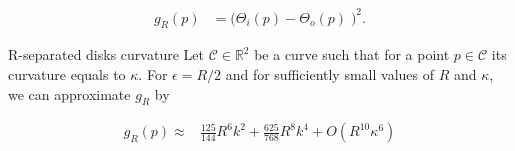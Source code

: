 \begin{align*}
	g_{R}(p) &= \Big( \Theta_i(p) - \Theta_o(p) \;\Big)^2.
\end{align*}

\begin{claim}{R-separated disks curvature}\label{claim:r-separated-disks}
 Let $\mathcal{C} \in \mathbb{R}^2$ be a curve such that for a point $p \in \mathcal{C}$ its curvature equals to $\kappa$. For $\epsilon=R/2$ and for sufficiently small values of $R$ and $\kappa$, we can approximate $g_R$ by


\begin{align*}
g_R(p) \approx & \frac{125}{144}R^6k^2 + \frac{625}{768}R^8k^4 + O(R^{10}\kappa^6)
\end{align*} 
\end{claim}


